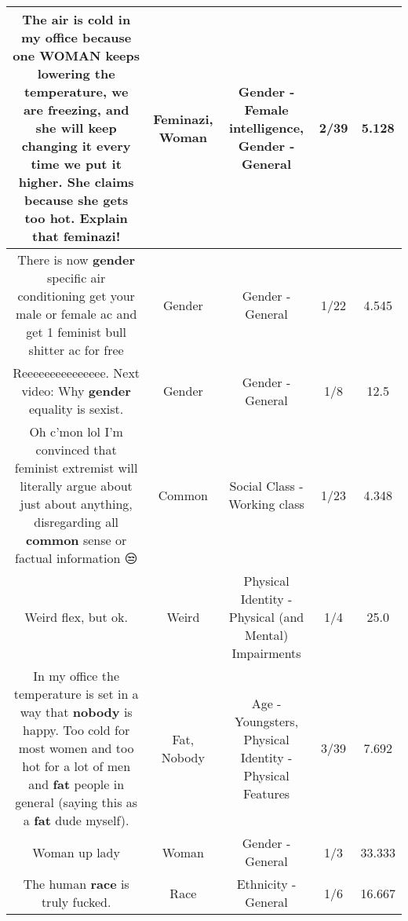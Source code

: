 \documentclass[11pt]{article}
\newlength\mylength
\begin{document}
\begin{center}
\begin{longtable}{|C{.65\mylength}|C{.30\mylength}|C{.12\mylength}|C{.12\mylength}|C{.12\mylength}|}
  \small The air is cold in my office because one \textbf{WOMAN} keeps lowering the temperature, we are freezing, and she will keep changing it every time we put it higher. She claims because she gets too hot. Explain that \textbf{feminazi}!\normalsize   & Feminazi, Woman & Gender - Female intelligence, Gender - General & 2/39 & 5.128 \\  \hline
  \small There is now \textbf{gender} specific air conditioning  get your male or female ac and get 1 feminist bull shitter ac for free\normalsize   & Gender & Gender - General & 1/22 & 4.545 \\  \hline
  \small Reeeeeeeeeeeeeee. Next video: Why \textbf{gender} equality is sexist.\normalsize   & Gender & Gender - General & 1/8 & 12.5 \\  \hline
  \small Oh c'mon lol I'm convinced that feminist extremist will literally argue about just about anything, disregarding all \textbf{common} sense or factual information 😒\normalsize   & Common & Social Class - Working class & 1/23 & 4.348 \\  \hline
  \small Weird flex, but ok.\normalsize   & Weird & Physical Identity - Physical (and Mental) Impairments & 1/4 & 25.0 \\  \hline
  \small In my office the temperature is set in a way that \textbf{nobody} is happy.  Too cold for most women and too hot for a lot of men and \textbf{fat} people in general (saying this as a \textbf{fat} dude myself).\normalsize   & Fat, Nobody & Age - Youngsters, Physical Identity - Physical Features & 3/39 & 7.692 \\  \hline
  \small Woman up lady\normalsize   & Woman & Gender - General & 1/3 & 33.333 \\  \hline
  \small The human \textbf{race} is truly fucked.\normalsize   & Race & Ethnicity - General & 1/6 & 16.667 \\  \hline

\end{longtable}
\end{center}
\end{document}
